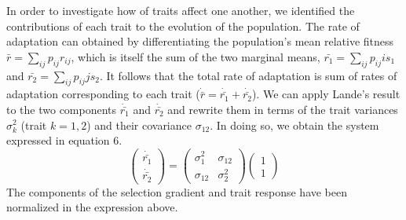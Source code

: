 \documentclass[9pt,twocolumn,twoside]{gsajnl}
\begin{document}
% 
% 
% 
In order to investigate how of traits affect one another, we identified the contributions of each trait to the evolution of the population. The rate of adaptation can obtained by differentiating the population's mean relative fitness $\bar{r}=\sum_{ij} p_{ij} r_{ij}$, which is itself the sum of the two marginal means, $\bar{r_1}=\sum_{ij} p_{ij} is_1$ and $\bar{r_2}=\sum_{ij} p_{ij} j s_2$.  It follows that the total rate of adaptation is sum of rates of adaptation corresponding to each trait ($\dot{\bar{r}}=\dot{\bar{r_1}} +\dot{\bar{r_2}}$).  We can apply Lande's result to the two components $\dot{\bar{r_1}} $ and $\dot{\bar{r_2}} $ and rewrite them in terms of the trait variances $\sigma_k^2$ (trait $k=1,2$) and their covariance $\sigma_{12}$.  In doing so, we obtain the system expressed in equation 6.
% 
% 
% 
% 
\begin{equation}
\left(
\begin{array}{c}
\dot{\bar{r_1}} \\
\dot{\bar{r_2}} 
\end{array}
\right)
=
\left(
\begin{array}{cc}
\sigma_1^2 & \sigma_{12} \\
\sigma_{12} & \sigma_2^2 
\end{array}
\right)
\left(
\begin{array}{c}
1 \\
1 
\end{array}
\right)
\end{equation}
The components of the selection gradient and trait response have been normalized in the expression above.  
\end{document}
